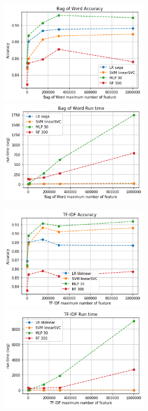 \documentclass[oneside,onecolumn]{article}
\begin{document}
\begin{figure}[H]
	\centering
	
	\includegraphics[height=5cm]{report_plot/plot_variable_dimension_desktop/bagofword_accurary_dimension.png}
	\includegraphics[height=5cm]{report_plot/plot_variable_dimension_desktop/bagofword_accurary_runtime.png}
	
	\includegraphics[height=5cm]{report_plot/plot_variable_dimension_surface/tf-idf_accurary_dimension.png}
	\includegraphics[height=5cm]{report_plot/plot_variable_dimension_surface/tf-idf_accurary_runtime.png}
	

\end{figure}
\end{document}

